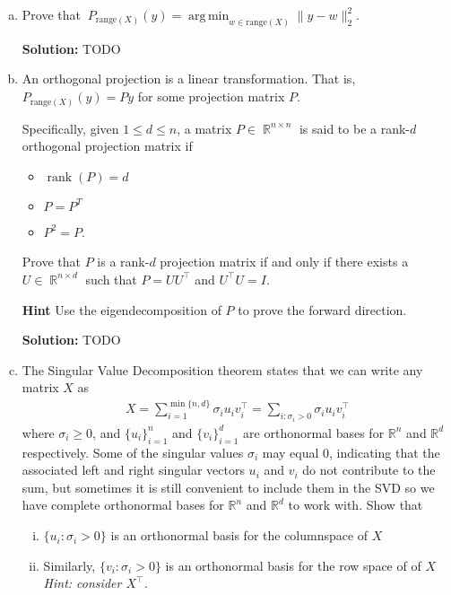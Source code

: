 \documentclass{article}
\DeclareMathOperator{\rank}{\mathrm{rank}}
\DeclareMathOperator{\R}{\mathbb{R}}
\DeclareMathOperator*{\argmin}{arg\,min}
\newenvironment{solution}{\color{blue} \smallskip \textbf{Solution:}}{}
\begin{document}
\begin{enumerate}[(a)]

    \item Prove that $\displaystyle \ P_{\text{range}(X)}(y) = \argmin_{w \in \mathrm{range}(X)} \|y - w\|_2^2$.

    \begin{solution}
        TODO
    \end{solution}

    \newpage
    \item An orthogonal projection is a linear transformation. That is, $P_{\text{range}(X)}(y) = Py$ for some projection matrix $P$. 
    
    Specifically, given $1 \le d \le n$, a matrix $P \in \R^{n \times n}$ is said to be a rank-$d$ orthogonal projection matrix if
    \begin{itemize}
        \item $\rank(P) = d$
        \item $P = P^{T}$
        \item $P^{2} = P$.
    \end{itemize}
    Prove that $P$ is a rank-$d$ projection matrix if and only if there exists a $U \in \R^{n \times d}$ such that $P = UU^\top$ and $U^{\top}U = I$.
    
    {\bf Hint} Use the eigendecomposition of $P$ to prove the forward direction.
    
    \begin{solution} 
        TODO
    \end{solution}

    \newpage
    \item
    The Singular Value Decomposition theorem states that we can write any matrix $X$ as 
    \begin{align*}
    X = \sum_{i=1}^{\min\{n,d\}} \sigma_{i} u_i v_i^{\top} = \sum_{i:\sigma_i > 0}\sigma_{i} u_i v_i^{\top}
    \end{align*}
    where $\sigma_{i} \ge 0$, and $\{u_i\}_{i=1}^n$ and $\{v_i\}_{i=1}^d$ are orthonormal bases for $\mathbb R^n$ and $\mathbb R^d$ respectively. Some of the singular values $\sigma_i$ may equal 0, indicating that the associated left and right singular vectors $u_i$ and $v_i$ do not contribute to the sum, but sometimes it is still convenient to include them in the SVD so we have complete orthonormal bases for $\mathbb R^n$ and $\mathbb R^d$ to work with.
    Show that 
    \begin{enumerate}[(i)]
    	\item $\{u_i : \sigma_i > 0\}$ is an orthonormal basis for the columnspace of $X$ 
    	\item Similarly, $\{v_i : \sigma_i > 0\}$ is an orthonormal basis for the row space of of $X$  \\ \emph{Hint: consider $X^\top$.}
    \end{enumerate}


\end{enumerate}
\end{document}
